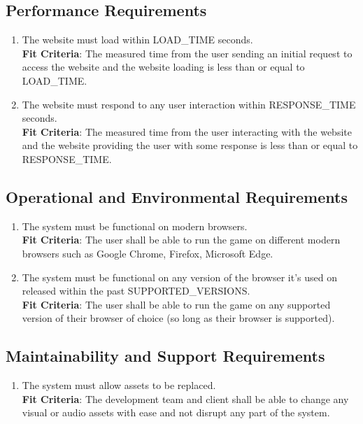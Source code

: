 \documentclass{article}
\begin{document}
\subsection{Performance Requirements}
\begin{enumerate}[{PR}1. ]
    \item The website must load within LOAD\_TIME seconds. \\
    \textbf{Fit Criteria}: The measured time from the user sending an initial request to access the website and the website loading is less than or equal to LOAD\_TIME.
    
    \item The website must respond to any user interaction within RESPONSE\_TIME seconds. \\
    \textbf{Fit Criteria}: The measured time from the user interacting with the website and the website providing the user with some response is less than or equal to RESPONSE\_TIME.
\end{enumerate}

\subsection{Operational and Environmental Requirements}
\begin{enumerate}[{OE}1. ]
    \item The system must be functional on modern browsers. \\
    \textbf{Fit Criteria}: The user shall be able to run the game on different modern browsers such as Google Chrome, Firefox, Microsoft Edge.
    
    \item The system must be functional on any version of the browser it's used on released within the past SUPPORTED\_VERSIONS. \\
    \textbf{Fit Criteria}: The user shall be able to run the game on any supported version of their browser of choice (so long as their browser is supported).
\end{enumerate}


\subsection{Maintainability and Support Requirements}
\begin{enumerate}[{MR}1. ]
    \label{MR1}
    \item The system must allow assets to be replaced. \\
    \textbf{Fit Criteria}: The development team and client shall be able to change any visual or audio assets with ease and not disrupt any part of the system.
\end{enumerate}
\end{document}
